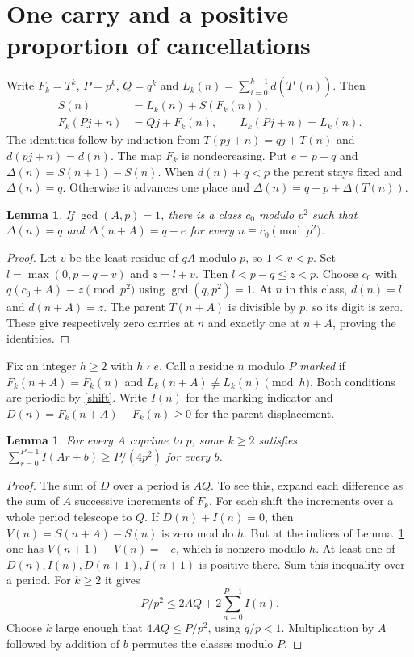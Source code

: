 \documentclass[11pt]{article}
\newtheorem{lemma}[theorem]{Lemma}
\begin{document}
\section{One carry and a positive proportion of cancellations}
Write $F_k=T^k$, $P=p^k$, $Q=q^k$ and
$L_k(n)=\sum_{i=0}^{k-1}d(T^i(n))$. Then
\begin{align}
 S(n)&=L_k(n)+S(F_k(n)),\nonumber\\
 F_k(Pj+n)&=Qj+F_k(n),\qquad L_k(Pj+n)=L_k(n).\label{shift}
\end{align}
The identities follow by induction from $T(pj+n)=qj+T(n)$ and $d(pj+n)=d(n)$.
The map $F_k$ is nondecreasing. Put $e=p-q$ and $\Delta(n)=S(n+1)-S(n)$.
When $d(n)+q<p$ the parent stays fixed and $\Delta(n)=q$. Otherwise it
advances one place and $\Delta(n)=q-p+\Delta(T(n))$.

\begin{lemma}\label{witness}
If $\gcd(A,p)=1$, there is a class $c_0$ modulo $p^2$ such that
$\Delta(n)=q$ and $\Delta(n+A)=q-e$ for every $n\equiv c_0\pmod{p^2}$.
\end{lemma}
\begin{proof}
Let $v$ be the least residue of $qA$ modulo $p$, so $1\le v<p$.
Set $l=\max(0,p-q-v)$ and $z=l+v$. Then $l<p-q\le z<p$.
Choose $c_0$ with $q(c_0+A)\equiv z\pmod{p^2}$ using $\gcd(q,p^2)=1$.
At $n$ in this class, $d(n)=l$ and $d(n+A)=z$. The parent $T(n+A)$
is divisible by $p$, so its digit is zero. These give respectively zero
carries at $n$ and exactly one at $n+A$, proving the identities.
\end{proof}

Fix an integer $h\ge2$ with $h\nmid e$. Call a residue $n$ modulo $P$
\emph{marked} if $F_k(n+A)=F_k(n)$ and
$L_k(n+A)\not\equiv L_k(n)\pmod h$. Both conditions are periodic by
\eqref{shift}. Write $I(n)$ for the marking indicator and
$D(n)=F_k(n+A)-F_k(n)\ge0$ for the parent displacement.
\begin{lemma}\label{mass}
For every $A$ coprime to $p$, some $k\ge2$ satisfies
$\sum_{r=0}^{P-1}I(Ar+b)\ge P/(4p^2)$ for every $b$.
\end{lemma}
\begin{proof}
The sum of $D$ over a period is $AQ$. To see this, expand each difference
as the sum of $A$ successive increments of $F_k$. For each shift the
increments over a whole period telescope to $Q$. If $D(n)+I(n)=0$,
then $V(n)=S(n+A)-S(n)$ is zero modulo $h$. But at the indices of
Lemma~\ref{witness} one has $V(n+1)-V(n)=-e$, which is nonzero modulo $h$.
At least one of $D(n),I(n),D(n+1),I(n+1)$ is positive there. Sum this
inequality over a period. For $k\ge2$ it gives
\[
 P/p^2\le 2AQ+2\sum_{n=0}^{P-1} I(n).
\]
Choose $k$ large enough that $4AQ\le P/p^2$, using $q/p<1$.
Multiplication by $A$ followed by addition of $b$ permutes the classes modulo $P$.
\end{proof}
\end{document}
